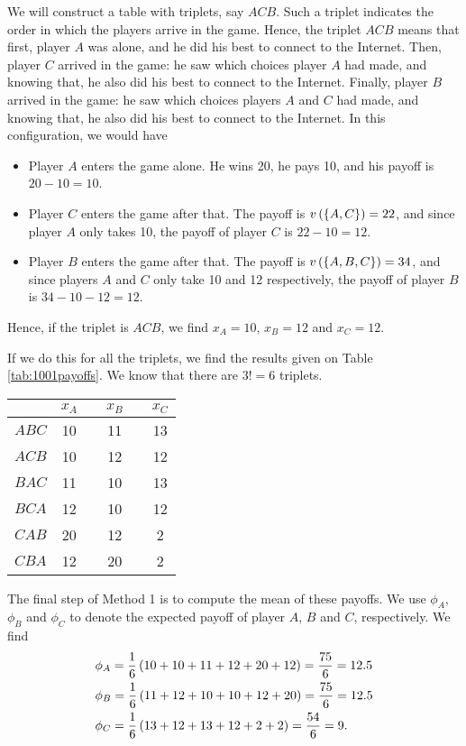 \begin{enumerate} [label=\alph*.]
	We will construct a table with triplets, say $ACB$. Such a triplet indicates the order in which the players arrive in the game. Hence, the triplet $ACB$ means that first, player $A$ was alone, and he did his best to connect to the Internet. Then, player $C$ arrived in the game: he saw which choices player $A$ had made, and knowing that, he also did his best to connect to the Internet. Finally, player $B$ arrived in the game: he saw which choices players $A$ and $C$ had made, and knowing that, he also did his best to connect to the Internet. In this configuration, we would have
	\begin{itemize}
	    \item Player $A$ enters the game alone. He wins 20, he pays 10, and his payoff is $20 - 10 = 10$.
	    \item Player $C$ enters the game after that. The payoff is $v \left(\left\{A, C\right\}\right) = 22$, and since player $A$ only takes 10, the payoff of player $C$ is $22 - 10 = 12$.
	    \item Player $B$ enters the game after that. The payoff is $v \left(\left\{A, B, C\right\}\right) = 34$, and since players $A$ and $C$ only take 10 and 12 respectively, the payoff of player $B$ is $34 - 10 - 12 = 12$.
	\end{itemize}
	
	Hence, if the triplet is $ACB$, we find $x_{A} = 10$, $x_{B} = 12$ and $x_{C} = 12$.
	
	If we do this for all the triplets, we find the results given on Table \ref{tab:1001payoffs}. We know that there are $3! = 6$ triplets.
	
	
\begin{tabular}[h!]{r|ccccc}
    & $x_{A}$ && $x_{B}$ && $x_{C}$ \\ \hline
$ABC$ & 10 && 11 && 13 \\
$ACB$ & 10 && 12 && 12 \\
$BAC$ & 11 && 10 && 13 \\
$BCA$ & 12 && 10 && 12 \\
$CAB$ & 20 && 12 && 2  \\
$CBA$ & 12 && 20 && 2 \\
\end{tabular}
\label{tab:1001payoffs}


The final step of Method 1 is to compute the mean of these payoffs. We use $\phi_{A}$, $\phi_{B}$ and $\phi_{C}$ to denote the expected payoff of player $A$, $B$ and $C$, respectively. We find
\begin{align*}
    & \phi_{A} = \dfrac{1}{6} \left(10 + 10 + 11 + 12 + 20 + 12\right) = \dfrac{75}{6} = 12.5 \\
    & \phi_{B} = \dfrac{1}{6} \left(11 + 12 + 10 + 10 + 12 + 20\right) = \dfrac{75}{6} = 12.5 \\
    & \phi_{C} = \dfrac{1}{6} \left(13 + 12 + 13 + 12 + 2 + 2\right) = \dfrac{54}{6} = 9.
\end{align*}
	   

\end{enumerate}
